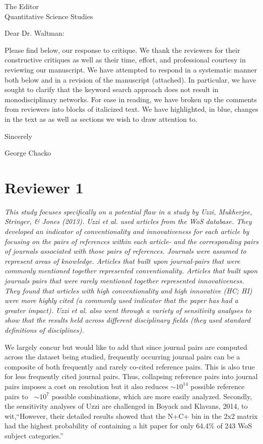 \documentclass[11pt, oneside]{article}   	%
\begin{document}

The Editor\\
Quantitative Science Studies

Dear Dr. Waltman:

Please find below, our response to critique. We thank the reviewers for their constructive critiques as well as their time, effort, and professional courtesy in reviewing our manuscript. We have attempted to respond  in a systematic manner both below and in a revision of the manuscript (attached). In particular, we have sought to clarify that the keyword search approach does not result in monodisciplinary networks. For ease in reading, we have broken up the comments from reviewers into blocks of italicized text. We have highlighted, in blue, changes in the text as as well as sections we wish to draw attention to.

Sincerely

George Chacko

\section{Reviewer 1}

\emph{This study focuses specifically on a potential flaw in a study by Uzzi, Mukherjee, Stringer, \& Jones  (2013).  Uzzi et al. used articles from the WoS database. They developed an indicator of conventionality and innovativeness for each article by focusing on the pairs of references within each article- and the corresponding pairs of journals associated with those pairs of references. Journals were assumed to represent areas of knowledge. Articles that built upon journal-pairs that were commonly mentioned together represented conventionality.  Articles that built upon journals pairs that were rarely mentioned together represented innovativeness. They found that articles with high conventionality and high innovative (HC; HI) were more highly cited (a commonly used indicator that the paper has had a greater impact). Uzzi et al. also went through a variety of sensitivity analyses to show that the results held across different disciplinary fields (they used standard definitions of disciplines).}   

We largely concur but would like to add that since journal pairs are computed across the dataset being studied, frequently occurring journal pairs can be a composite of both frequently and rarely co-cited reference pairs. This is also true for less frequently cited journal pairs. Thus, collapsing reference pairs into journal pairs imposes a cost on resolution but it also reduces $\sim10^{14}$ possible reference pairs to ~$\sim10^7$ possible combinations, which are more easily analyzed. Secondly, the sensitivity analyses of Uzzi are challenged in Boyack and Klavans, 2014, to wit,``However, their detailed results showed that the N+C+ bin in the 2x2 matrix had the highest probability of containing a hit paper for only 64.4\% of 243 WoS subject categories.'' 
\end{document}
